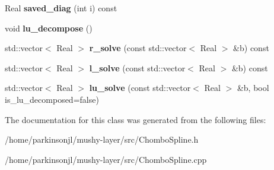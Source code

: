 \begin{DoxyCompactItemize}
\item 
\hypertarget{classband__matrix_afac2203c979ad33886bf6829c2d0c94f}{Real {\bfseries saved\-\_\-diag} (int i) const }\label{classband__matrix_afac2203c979ad33886bf6829c2d0c94f}

\item 
\hypertarget{classband__matrix_ac5e874f32b8256dc18e5722997f79792}{void {\bfseries lu\-\_\-decompose} ()}\label{classband__matrix_ac5e874f32b8256dc18e5722997f79792}

\item 
\hypertarget{classband__matrix_ac3876eb17d6092b111a7f973276815c2}{std\-::vector$<$ Real $>$ {\bfseries r\-\_\-solve} (const std\-::vector$<$ Real $>$ \&b) const }\label{classband__matrix_ac3876eb17d6092b111a7f973276815c2}

\item 
\hypertarget{classband__matrix_a9278ea9153d956d70e967d78ddafdd04}{std\-::vector$<$ Real $>$ {\bfseries l\-\_\-solve} (const std\-::vector$<$ Real $>$ \&b) const }\label{classband__matrix_a9278ea9153d956d70e967d78ddafdd04}

\item 
\hypertarget{classband__matrix_a7e7b28c210d76f3826dac2462ebdca48}{std\-::vector$<$ Real $>$ {\bfseries lu\-\_\-solve} (const std\-::vector$<$ Real $>$ \&b, bool is\-\_\-lu\-\_\-decomposed=false)}\label{classband__matrix_a7e7b28c210d76f3826dac2462ebdca48}

\end{DoxyCompactItemize}


The documentation for this class was generated from the following files\-:\begin{DoxyCompactItemize}
\item 
/home/parkinsonjl/mushy-\/layer/src/Chombo\-Spline.\-h\item 
/home/parkinsonjl/mushy-\/layer/src/Chombo\-Spline.\-cpp\end{DoxyCompactItemize}

